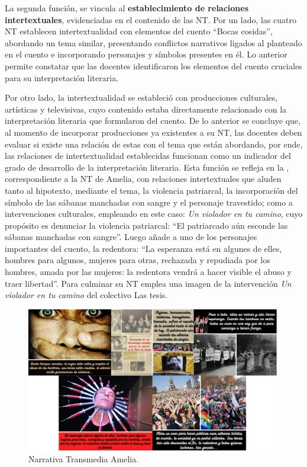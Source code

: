 \documentclass[spanish]{textolivre}
\begin{document}
La segunda función, se vincula al \textbf{establecimiento de relaciones intertextuales}, evidenciadas en el contenido de las NT. Por un lado, las cuatro NT establecen intertextualidad con elementos del cuento “Bocas cosidas”, abordando un tema similar, presentando conflictos narrativos ligados al planteado en el cuento e incorporando personajes y símbolos presentes en él. Lo anterior permite constatar que las docentes identificaron los elementos del cuento cruciales para su interpretación literaria.

Por otro lado, la intertextualidad se estableció con producciones culturales, artísticas y televisivas, cuyo contenido estaba directamente relacionado con la interpretación literaria que formularon del cuento. De lo anterior se concluye que, al momento de incorporar producciones ya existentes a su NT, las docentes deben evaluar si existe una relación de estas con el tema que están abordando, por ende, las relaciones de intertextualidad establecidas funcionan como un indicador del grado de desarrollo de la interpretación literaria. Esta función se refleja en la , correspondiente a la NT de Amelia, con relaciones intertextuales que aluden tanto al hipotexto, mediante el tema, la violencia patriarcal, la incorporación del símbolo de las sábanas manchadas con sangre y el personaje travestido; como a intervenciones culturales, empleando en este caso: \textit{Un violador en tu camino}, cuyo propósito es denunciar la violencia patriarcal: “El patriarcado aún esconde las sábanas manchadas con sangre”. Luego añade a uno de los personajes importantes del cuento, la redentora: “La esperanza está en algunes de elles, hombres para algunos, mujeres para otras, rechazada y repudiada por los hombres, amada por las mujeres: la redentora vendrá a hacer visible el abuso y traer libertad”. Para culminar su NT emplea una imagen de la intervención \textit{Un violador en tu camino} del colectivo Las tesis.

\begin{figure}[htbp]
 \centering
 \begin{minipage}{.85\textwidth}
 \includegraphics[width=\textwidth]{Fig2.png}
 \caption{Narrativa Transmedia Amelia.}
 \label{fig02}
 \end{minipage}
\end{figure}
\end{document}
